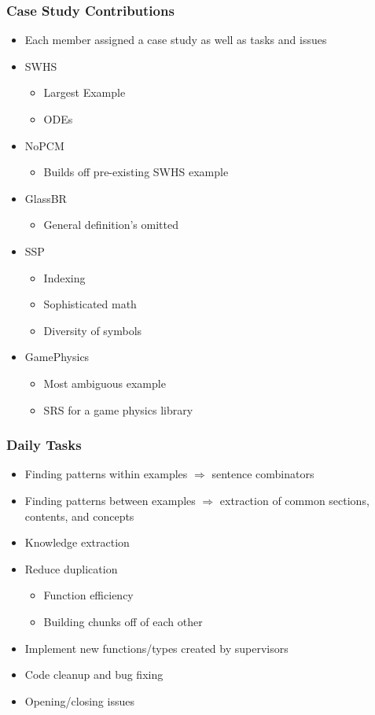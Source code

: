 \documentclass{beamer}
\begin{document}
\begin{frame}
\frametitle{Case Study Contributions}
\begin{itemize}
\item<1-> Each member assigned a case study as well as tasks and issues
\item<2-> SWHS
  \begin{itemize}
    \item Largest Example
    \item ODEs
  \end{itemize}
\item<3-> NoPCM
  \begin{itemize}
    \item Builds off pre-existing SWHS example
  \end{itemize}
\item<4-> GlassBR
  \begin{itemize}
    \item General definition's omitted
  \end{itemize}
\item<5-> SSP
  \begin{itemize}
    \item Indexing
    \item Sophisticated math
    \item Diversity of symbols
  \end{itemize}
\item<6-> GamePhysics
  \begin{itemize}
    \item Most ambiguous example
    \item SRS for a game physics library
  \end{itemize}
\end{itemize}
\end{frame}

\begin{frame}
\frametitle{Daily Tasks}
\begin{itemize}
 \item<1-> Finding patterns within examples $\Rightarrow$ sentence combinators
 \item<2-> Finding patterns between examples $\Rightarrow$ extraction of common sections, contents, and concepts
 \item<3-> Knowledge extraction
 \item<4-> Reduce duplication
   \begin{itemize}
     \item Function efficiency
     \item Building chunks off of each other
   \end{itemize}
 \item<5-> Implement new functions/types created by supervisors
 \item<6-> Code cleanup and bug fixing
 \item<7-> Opening/closing issues
\end{itemize}
\end{frame}
\end{document}
